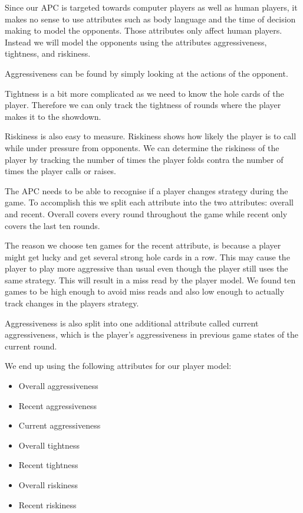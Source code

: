 Since our APC is targeted towards computer players as well as human players, it makes no sense to use attributes such as body language and the time of decision making to model the opponents. Those attributes only affect human players. Instead we will model the opponents using the attributes aggressiveness, tightness, and riskiness.

Aggressiveness can be found by simply looking at the actions of the opponent. 

Tightness is a bit more complicated as we need to know the hole cards of the player. Therefore we can only track the tightness of rounds where the player makes it to the showdown.

Riskiness is also easy to measure. Riskiness shows how likely the player is to call while under pressure from opponents. We can determine the riskiness of the player by tracking the number of times the player folds contra the number of times the player calls or raises.

The APC needs to be able to recognise if a player changes strategy during the game. To accomplish this we split each attribute into the two attributes: overall and recent. Overall covers every round throughout the game while recent only covers the last ten rounds.

The reason we choose ten games for the recent attribute, is because a player might get lucky and get several strong hole cards in a row. This may cause the player to play more aggressive than usual even though the player still uses the same strategy. This will result in a miss read by the player model. We found ten games to be high enough to avoid miss reads and also low enough to actually track changes in the players strategy.

Aggressiveness is also split into one additional attribute called current aggressiveness, which is the player's aggressiveness in previous game states of the current round.

We end up using the following attributes for our player model:
\begin{itemize}
\item Overall aggressiveness
\item Recent aggressiveness
\item Current aggressiveness
\item Overall tightness
\item Recent tightness
\item Overall riskiness
\item Recent riskiness
\end{itemize}

